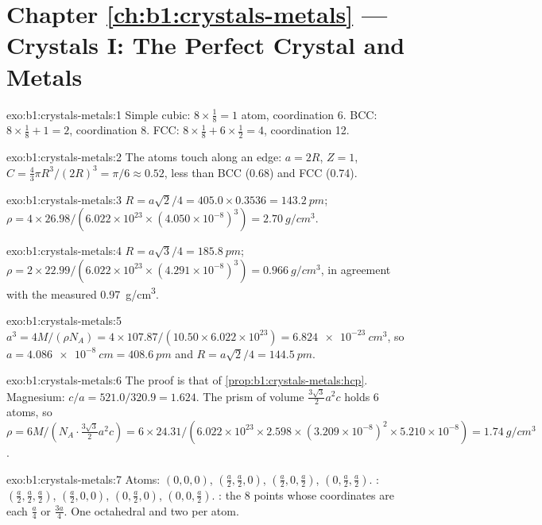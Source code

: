 \section*{Chapter \ref{ch:b1:crystals-metals} --- Crystals I: The Perfect Crystal and Metals}

\begin{solution}{exo:b1:crystals-metals:1}
Simple cubic: $8 \times \frac18 = 1$ atom, coordination 6. BCC: $8 \times
\frac18 + 1 = 2$, coordination 8. FCC: $8 \times \frac18 + 6 \times
\frac12 = 4$, coordination 12.
\end{solution}

\begin{solution}{exo:b1:crystals-metals:2}
The atoms touch along an edge: $a = 2R$, $Z = 1$, $C = \frac43\pi R^3/(2R)^3
= \pi/6 \approx 0.52$, less than BCC (0.68) and FCC (0.74).
\end{solution}

\begin{solution}{exo:b1:crystals-metals:3}
$R = a\sqrt2/4 = 405.0 \times 0.3536 = \qty{143.2}{pm}$;
$\rho = 4 \times 26.98/(6.022 \times 10^{23} \times (4.050 \times
10^{-8})^3) = \qty{2.70}{g/cm^3}$.
\end{solution}

\begin{solution}{exo:b1:crystals-metals:4}
$R = a\sqrt3/4 = \qty{185.8}{pm}$; $\rho = 2 \times 22.99/(6.022 \times
10^{23} \times (4.291 \times 10^{-8})^3) = \qty{0.966}{g/cm^3}$, in
agreement with the measured \qty{0.97}{g/cm^3}.
\end{solution}

\begin{solution}{exo:b1:crystals-metals:5}
$a^3 = 4M/(\rho N_A) = 4 \times 107.87/(10.50 \times 6.022 \times 10^{23}) =
\qty{6.824e-23}{cm^3}$, so $a = \qty{4.086e-8}{cm} = \qty{408.6}{pm}$ and
$R = a\sqrt2/4 = \qty{144.5}{pm}$.
\end{solution}

\begin{solution}{exo:b1:crystals-metals:6}
The proof is that of \cref{prop:b1:crystals-metals:hcp}. Magnesium:
$c/a = 521.0/320.9 = 1.624$. The prism of volume
$\frac{3\sqrt3}{2}a^2c$ holds 6 atoms, so $\rho = 6M/(N_A \cdot
\frac{3\sqrt3}{2}a^2c) = 6 \times 24.31/(6.022 \times 10^{23} \times
2.598 \times (3.209 \times 10^{-8})^2 \times 5.210 \times 10^{-8}) =
\qty{1.74}{g/cm^3}$.
\end{solution}

\begin{solution}{exo:b1:crystals-metals:7}
Atoms: $(0,0,0)$, $(\frac a2,\frac a2,0)$, $(\frac a2,0,\frac a2)$,
$(0,\frac a2,\frac a2)$. : $(\frac a2,\frac a2,\frac a2)$,
$(\frac a2,0,0)$, $(0,\frac a2,0)$, $(0,0,\frac a2)$. : the
8 points whose coordinates are each $\frac a4$ or $\frac{3a}{4}$. One
octahedral and two  per atom.
\end{solution}

